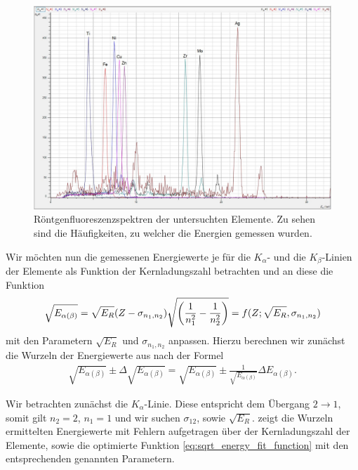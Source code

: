 \begin{figure}[H]
  \centering
  \includegraphics[width=\textwidth]{files/elemente_metalle.jpg}
  \caption{Röntgenfluoreszenzspektren der untersuchten Elemente. Zu sehen sind die Häufigkeiten, zu welcher die Energien gemessen wurden.}
  \label{fig:elemente_metalle}
\end{figure}
\newpage\noindent
Wir möchten nun die gemessenen Energiewerte je für die $K_{\alpha}$- und die $K_{\beta}$-Linien der Elemente als Funktion der Kernladungszahl betrachten und an diese die Funktion
\begin{align}
  \sqrt{E_{\alpha(\beta)}} = \sqrt{E_R} (Z - \sigma_{n_1, n_2}) \sqrt{\qty(\frac{1}{n_1^2} - \frac{1}{n_2^2})} = f(Z; \sqrt{E_R}, \sigma_{n_1, n_2})\label{eq:sqrt_energy_fit_function}
\end{align}
mit den Parametern $\sqrt{E_R}$ und $\sigma_{n_1, n_2}$ anpassen. Hierzu berechnen wir zunächst die Wurzeln der Energiewerte aus  nach der Formel
\begin{align}
  \sqrt{E_{\alpha(\beta)}} \pm \Delta \sqrt{E_{\alpha(\beta)}} = \sqrt{E_{\alpha(\beta)}} \pm \frac{1}{\sqrt{E_{\alpha(\beta)}}} \Delta E_{\alpha(\beta)}.
\end{align}

Wir betrachten zunächst die $K_{\alpha}$-Linie. Diese entspricht dem Übergang $2 \to 1$, somit gilt $n_2 = 2$, $n_1 = 1$ und wir suchen $\sigma_{12}$, sowie $\sqrt{E_R}$.  zeigt die Wurzeln ermittelten Energiewerte mit Fehlern aufgetragen über der Kernladungszahl der Elemente, sowie die optimierte Funktion \eqref{eq:sqrt_energy_fit_function} mit den entsprechenden genannten Parametern.

